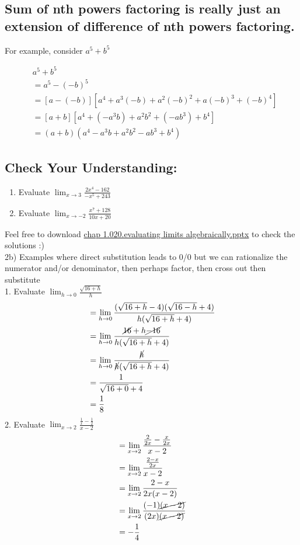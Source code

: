 \documentclass{article}
\begin{document}
\subsection*{Sum of nth powers factoring is really just an extension of difference of nth powers factoring.}
For example, consider $a^5+b^5$

$$
\begin{aligned}
& a^5+b^5 \\
& =a^5-(-b)^5 \\
& =[a-(-b)]\left[a^4+a^3(-b)+a^2(-b)^2+a(-b)^3+(-b)^4\right] \\
& =[a+b]\left[a^4+\left(-a^3 b\right)+a^2 b^2+\left(-a b^3\right)+b^4\right] \\
& =(a+b)\left(a^4-a^3 b+a^2 b^2-a b^3+b^4\right)
\end{aligned}
$$ 
\subsection*{Check Your Understanding:}
\begin{enumerate}
    \item Evaluate $\lim_{x \to 3}\frac{2x^4-162}{-x^5+243}$
    \item Evaluate $\lim_{x \to -2}\frac{x^7+128}{10x+20}$ 
\end{enumerate}
Feel free to download \href{https://github.com/Kensukeken/MCV4U-Calculus-and-Vectors-Notes/blob/main/Lessons%20in%20Power%20Point%20Form/Unit%201/chap%201.010.evaluating%20limits%20graphically.pptx}{chap 1.020.evaluating limits algebraically.pptx} to check the solutions :) \\

 2b)  Examples where direct substitution leads to 0/0 but we can rationalize the numerator and/or denominator, then perhaps factor, then cross out then substitute\\

 1. Evaluate $\lim_{h\to 0}\frac{\sqrt{16+h}}{h}$
 \begin{align*}
     &=\lim_{h\to 0}\frac{(\sqrt{16+h}-4)(\sqrt{16-h}+4)}{h(\sqrt{16+h}+4)}\\
     &=\lim_{h\to 0}\frac{\cancel{16}+h\cancel{-16}}{h(\sqrt{16+h}+4)}\\
     &=\lim_{h\to 0}\frac{\cancel{h}}{\cancel{h}(\sqrt{16+h}+4)}\\
     &=\frac{1}{\sqrt{16+0}+4}\\
     &=\frac{1}{8}
 \end{align*}
2. Evaluate $\lim_{x \to 2}\frac{\frac{1}{x}-\frac{1}{2}}{x-2}$
\begin{align*}
    &=\lim_{x \to 2}\frac{\frac{2}{2x}-\frac{x}{2x}}{x-2}\\
    &=\lim_{x \to 2}\frac{\frac{2-x}{2x}}{x-2}\\
    &=\lim_{x \to 2}\frac{2-x}{2x(x-2)}\\
    &=\lim_{x \to 2}\frac{(-1)\cancel{(x-2)}}{(2x)\cancel{(x-2)}}\\
    &=-\frac{1}{4}
\end{align*}
\end{document}
